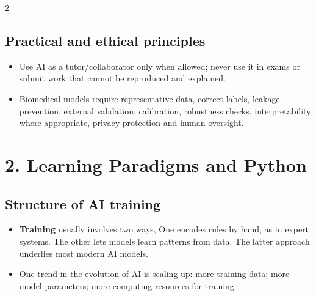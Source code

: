 \documentclass[10pt,a4paper]{ctexart}
\newcommand{\key}[1]{\textbf{#1}}
\begin{document}
\begin{multicols*}{2}
\subsection{Practical and ethical principles}
\begin{itemize}
  \item Use AI as a tutor/collaborator only when allowed; never use it in exams or submit work that cannot be reproduced and explained.
  \item Biomedical models require representative data, correct labels, leakage prevention, external validation, calibration, robustness checks, interpretability where appropriate, privacy protection and human oversight.
\end{itemize}

\section{2. Learning Paradigms and Python}
\subsection{Structure of AI training}
\begin{itemize}
  \item \key{Training} usually involves two ways, One encodes rules by hand, as in expert systems. 
  The other lets models learn patterns from data. The latter approach underlies most modern AI models.
  \item One trend in the evolution of AI is scaling up: more training data; more model parameters; more computing resources for training.
\end{itemize}


\end{multicols*}
\end{document}
